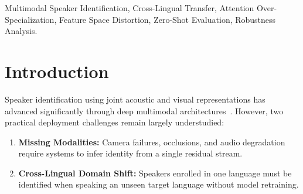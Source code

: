 \documentclass[conference]{IEEEtran}
\newcommand{\fopmav}{FOP\textsubscript{MAV}}
\begin{document}
\begin{abstract}
When do sophisticated multimodal fusion mechanisms hurt rather than help cross-lingual generalization?
We investigate this fundamental question for zero-shot cross-lingual speaker identification on MAV-Celeb (training speaker identity exclusively on English and evaluating zero-shot on Urdu).
Under a rigorous 4-fold cross-validation protocol evaluated across 3 random seeds ($N=12$ evaluation runs per configuration), our baseline \fopmav{} with linear fusion achieves an exceptional $98.14 \pm 0.18\%$ zero-shot Urdu multimodal accuracy ($P_5$, 95\% CI: $[98.04\%, 98.22\%]$).
However, augmenting this system with MultiBranch multi-head self-attention fusion causes a severe 17.30-point accuracy drop ($P_5: 98.14 \pm 0.18\% \to 80.84 \pm 0.25\%$, $p < 0.001$, 95\% CI for drop: $[16.85\%, 17.75\%]$), despite improving within-distribution missing-modality robustness.
Through a systematic $3 \times 2$ optimizer factorial ablation (AdamW vs. SAM+SWA), we establish that this performance drop is architectural ($\overline{|\Delta P_5|} = 0.52\%$).
Our empirical diagnostics demonstrate that attention-based fusion over-specializes to training-domain audio-visual feature co-occurrences, causing a significant drop in Attention Shannon Entropy ($H(A): 3.84 \to 1.12$ bits) and suppressing cross-lingual visual anchors.
We synthesize these findings into actionable architectural design guidelines for multimodal biometrics practitioners.
\end{abstract}

\begin{IEEEkeywords}
Multimodal Speaker Identification, Cross-Lingual Transfer, Attention Over-Specialization, Feature Space Distortion, Zero-Shot Evaluation, Robustness Analysis.
\end{IEEEkeywords}

\section{Introduction}
\label{sec:intro}

Speaker identification using joint acoustic and visual representations has advanced
significantly through deep multimodal architectures~\cite{nagrani2018seeing}.
However, two practical deployment challenges remain largely understudied:

\begin{enumerate}
    \item \textbf{Missing Modalities:} Camera failures, occlusions, and audio degradation
    require systems to infer identity from a single residual stream.
    \item \textbf{Cross-Lingual Domain Shift:} Speakers enrolled in one language must be
    identified when speaking an unseen target language without model retraining.
\end{enumerate}
\end{document}
